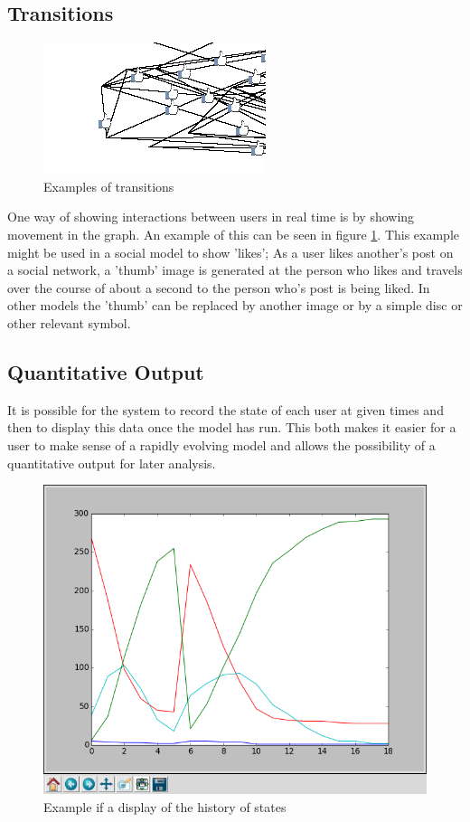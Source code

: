 \documentclass[12pt,a4paper]{article}
\begin{document}
\subsection{Transitions}

\begin{figure}[htb]
\caption{Examples of transitions}
\label{fig:transitions}
\centering
\includegraphics[scale=0.7]{Transitions.png}
\end{figure}

\noindent
One way of showing interactions between users in real time is by showing movement in the graph. An example of this can be seen in figure \ref{fig:transitions}. This example might be used in a social model to show 'likes'; As a user likes another's post on a social network, a 'thumb' image is generated at the person who likes and travels over the course of about a second to the person who's post is being liked. In other models the 'thumb' can be replaced by another image or by a simple disc or other relevant symbol.

\subsection{Quantitative Output}
\noindent
It is possible for the system to record the state of each user at given times and then to display this data once the model has run. This both makes it easier for a user to make sense of a rapidly evolving model and allows the possibility of a quantitative output for later analysis.

\begin{figure}[htb]
\caption{Example if a display of the history of states}
\label{fig:history}
\centering
\includegraphics[scale=0.3]{Graph.png}
\end{figure}
\end{document}
